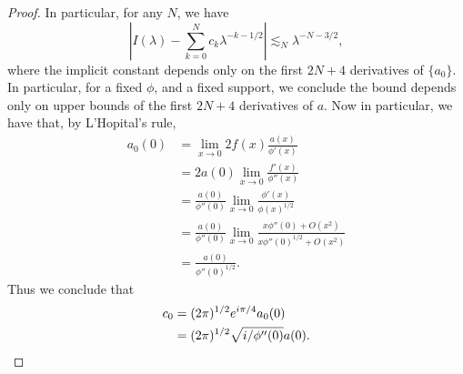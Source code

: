 \begin{proof}
    In particular, for any $N$, we have
    \[ | I(\lambda) - \sum_{k = 0}^N c_k \lambda^{-k-1/2} | \lesssim_N \lambda^{-N-3/2}, \]
    where the implicit constant depends only on the first $2N+4$ derivatives of $\{ a_0 \}$. In particular, for a fixed $\phi$, and a fixed support, we conclude the bound depends only on upper bounds of the first $2N+4$ derivatives of $a$. Now in particular, we have that, by L'Hopital's rule,
    \begin{align*}
        a_0(0) &= \lim_{x \to 0} 2 f(x) \frac{a(x)}{\phi'(x)}\\
        &= 2 a(0) \lim_{x \to 0} \frac{f'(x)}{\phi''(x)}\\
        &= \frac{a(0)}{\phi''(0)} \lim_{x \to 0} \frac{\phi'(x)}{\phi(x)^{1/2}}\\
        &= \frac{a(0)}{\phi''(0)} \lim_{x \to 0} \frac{x \phi''(0) + O(x^2)}{x \phi''(0)^{1/2} + O(x^2)}\\
        &= \frac{a(0)}{\phi''(0)^{1/2}}.
    \end{align*}
    Thus we conclude that
    \begin{align*}
        c_0 &= (2 \pi)^{1/2} e^{i \pi / 4} a_0(0)\\
        &= (2 \pi)^{1/2} \sqrt{ i / \phi''(0) } a(0). \qedhere
    \end{align*}
\end{proof}

    \begin{comment}


  \[ I(\lambda) = \int a(x) e^{i \lambda \phi(x)}\; dx = \int a_0(y) e^{i \lambda y^2}\; dy. \]
  Thus we can apply the previous theorem to conclude that there exists a sequence of constants $\{ c_n \}$ such that for each $N$,
  \[ \left( \frac{d}{d\lambda} \right)^k I(\lambda) = \left( \frac{d}{d\lambda} \right)^k \left\{ \lambda^{-1/2} \sum_{n = 0}^N c_n \lambda^{-n} \right\} + O_{\phi,a,N,k}(1/\lambda^{N+m+3/2}). \]
  The existence in this theorem is a \emph{constructive} existence statement. The proof gives an effective algorithm to produce as many constants $c_n$ as required for any particular phase $\phi$, provided one can explicitly write out the function $y(x)$. In particular, if the phase has only a single stationary point at the origin,
  \[ c_0 = 2^{-1/2} e^{i\pi/4} a_0(0) = 2^{-1/2} e^{i\pi/4} a(0) / y'(0). \]
  Since
  \begin{align*}
    y'(0) &= \lim_{x \to 0^+} y'(x) = \lim_{x \to 0^+} \frac{\phi'(x)}{2 \phi(x)^{1/2}}\\
    &= \lim_{x \to 0^+} (1/2) \frac{\phi'(x)}{x} \left( \frac{x^2}{\phi(x)} \right)^{1/2} = (\phi''(0)/2)^{1/2}.
  \end{align*}
  This means that $c_0 = e^{i\pi/4} a(0) \phi''(0)^{-1/2}$.
  \end{comment}

